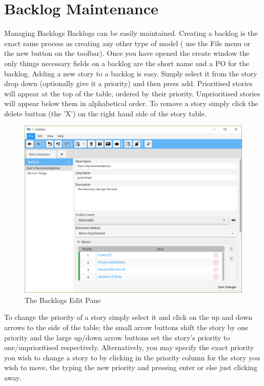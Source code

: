 \section{Backlog Maintenance}

Managing Backlogs
\newline\newline
Backlogs can be easily maintained. Creating a backlog is the exact same process as creating any other type of model ( use the File menu or the new button on the toolbar). Once you have opened the create window the only things necessary fields on a backlog are the short name and a PO for the backlog.
\newline
Adding a new story to a backlog is easy. Simply select it from the story drop down (optionally give it a priority) and then press add. Prioritised stories will appear at the top of the table, ordered by their priority. Unprioritised stories will appear below them in alphabetical order. To remove a story simply click the delete button (the 'X') on the right hand side of the story table.

\begin{figure}[H]
\centering
\includegraphics[width=\textwidth]{images/screenshots/backlogs.PNG}
\caption{The Backlogs Edit Pane}
\label{fig:new_project}
\end{figure}

\bigskip
To change the priority of a story simply select it and click on the up and down arrows to the side of the table; the small arrow buttons shift the story by one priority and the large up/down arrow buttons set the story's priority to one/unprioritised respectively. Alternatively, you may specify the exact priority you wish to change a story to by clicking in the priority column for the story you wish to move, the typing the new priority and pressing enter or else just clicking away.

